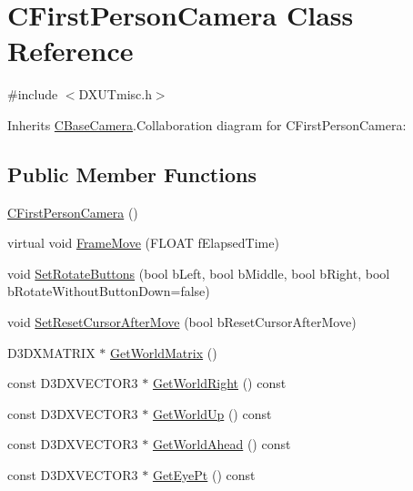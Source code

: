 \hypertarget{class_c_first_person_camera}{
\section{CFirstPersonCamera Class Reference}
\label{class_c_first_person_camera}
}


{\ttfamily \#include $<$DXUTmisc.h$>$}

Inherits \hyperlink{class_c_base_camera}{CBaseCamera}.Collaboration diagram for CFirstPersonCamera:\subsection*{Public Member Functions}
\begin{DoxyCompactItemize}
\item 
\hyperlink{class_c_first_person_camera_a0c277136d6a3593f8206428eb37e0500}{CFirstPersonCamera} ()
\item 
virtual void \hyperlink{class_c_first_person_camera_a86e482e92a7a17db600e82ad9a29ca01}{FrameMove} (FLOAT fElapsedTime)
\item 
void \hyperlink{class_c_first_person_camera_a96068a7b6bd4cdeeedc72877dba948dc}{SetRotateButtons} (bool bLeft, bool bMiddle, bool bRight, bool bRotateWithoutButtonDown=false)
\item 
void \hyperlink{class_c_first_person_camera_a3dab3253ef350050b3cb03e6e059596a}{SetResetCursorAfterMove} (bool bResetCursorAfterMove)
\item 
D3DXMATRIX $\ast$ \hyperlink{class_c_first_person_camera_af24e375a682bac077ab06c24a22870e3}{GetWorldMatrix} ()
\item 
const D3DXVECTOR3 $\ast$ \hyperlink{class_c_first_person_camera_a0ca46ea7c1d52786b1f149b4a12be986}{GetWorldRight} () const 
\item 
const D3DXVECTOR3 $\ast$ \hyperlink{class_c_first_person_camera_adb1c6d58d95eb38416facd8217d9e565}{GetWorldUp} () const 
\item 
const D3DXVECTOR3 $\ast$ \hyperlink{class_c_first_person_camera_ab672fff686f1f13a88997176bdd2bd04}{GetWorldAhead} () const 
\item 
const D3DXVECTOR3 $\ast$ \hyperlink{class_c_first_person_camera_a0191f784e950825ac77825ef5c3b6295}{GetEyePt} () const 
\end{DoxyCompactItemize}
